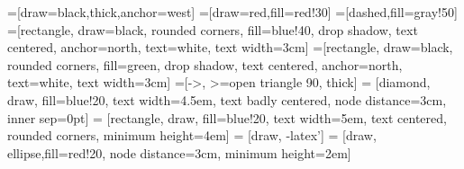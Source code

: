 \documentclass[a4paper,12pt,titlepage]{article}
\begin{document}
=[draw=black,thick,anchor=west]
=[draw=red,fill=red!30]
=[dashed,fill=gray!50]
=[rectangle, draw=black, rounded corners, fill=blue!40, drop shadow,
        text centered, anchor=north, text=white, text width=3cm]
=[rectangle, draw=black, rounded corners, fill=green, drop shadow,
        text centered, anchor=north, text=white, text width=3cm]
=[->, >=open triangle 90, thick]
 = [diamond, draw, fill=blue!20,
    text width=4.5em, text badly centered, node distance=3cm, inner sep=0pt]
 = [rectangle, draw, fill=blue!20,
    text width=5em, text centered, rounded corners, minimum height=4em]
 = [draw, -latex']
 = [draw, ellipse,fill=red!20, node distance=3cm,
    minimum height=2em]

\newcount\colveccount
\newcommand*\colvec[1]{
        \global\colveccount#1
        \begin{pmatrix}
        \colvecnext
}
\def\colvecnext#1{
        #1
        \global\advance\colveccount-1
        \ifnum\colveccount>0
                \\
                \expandafter\colvecnext
        \else
                \end{pmatrix}
        \fi
}
\end{document}
